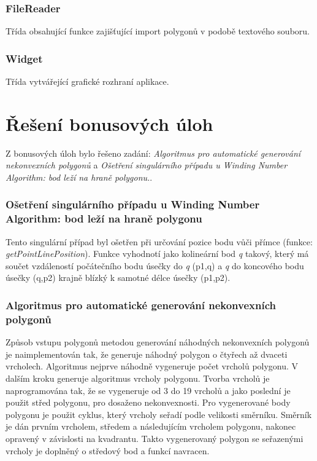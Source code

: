 \documentclass[a4paper, 12pt]{article}
\begin{document}
\subsubsection{FileReader}
Třída obsahující funkce zajišťující import polygonů v podobě textového souboru.

\subsubsection{Widget}
Třída vytvářející grafické rozhraní aplikace.

\section{Řešení bonusových úloh}
Z bonusových úloh bylo řešeno zadání: \textit{Algoritmus pro automatické generování nekonvexních polygonů} a \textit{Ošetření singulárního případu u Winding Number Algorithm: bod leží na hraně polygonu.}.

\subsubsection{Ošetření singulárního případu u Winding Number Algorithm: bod leží na hraně polygonu}
Tento singulární případ byl ošetřen při určování pozice bodu vůči přímce (funkce: \textit{getPointLinePosition}). Funkce vyhodnotí jako kolineární bod \textit{q}  takový, který má součet vzdáleností počátečního bodu úsečky do \textit{q} (p1,q) a \textit{q} do koncového bodu úsečky (q,p2) krajně blízký k samotné délce úsečky (p1,p2).

\subsubsection{Algoritmus pro automatické generování nekonvexních polygonů}
Způsob vstupu polygonů metodou generování náhodných nekonvexních polygonů je naimplementován tak, že generuje náhodný polygon o čtyřech až dvaceti vrcholech. Algoritmus nejprve náhodně vygeneruje počet vrcholů polygonu. V dalším kroku generuje algoritmus vrcholy polygonu. Tvorba vrcholů je naprogramována tak, že se vygeneruje od 3 do 19 vrcholů a jako poslední je použit střed polygonu, pro dosaženo nekonvexnosti. Pro vygenerované body polygonu je použit cyklus, který vrcholy seřadí podle velikosti směrníku. Směrník je dán prvním vrcholem, středem a následujícím vrcholem polygonu, nakonec opravený v závislosti na kvadrantu. Takto vygenerovaný polygon se seřazenými vrcholy je doplněný o středový bod a funkcí navracen.
\end{document}
